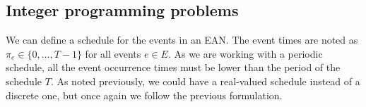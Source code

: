 \documentclass[english, 12pt, a4paper, sci, utf8, a-2b, online]{aaltothesis}
\begin{document}





\subsection{Integer programming problems}

We can define a schedule for the events in an EAN. The event times are noted as $\pi_e \in \{0, \dots, T-1\}$ for all events $e \in E$. As we are working with a periodic schedule, all the event occurrence times must be lower than the period of the schedule $T$. As noted previously, we could have a real-valued schedule instead of a discrete one, but once again we follow the previous formulation.
\end{document}
